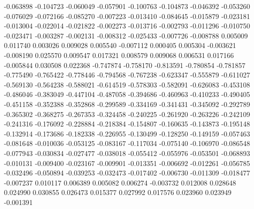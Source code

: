 -0.063898
-0.104723
-0.060049
-0.057901
-0.100763
-0.104873
-0.046392
-0.053260
-0.076029
-0.072166
-0.085270
-0.007223
-0.013410
-0.084645
-0.015879
-0.023181
-0.013004
-0.022014
-0.021822
-0.002273
-0.013716
-0.002793
-0.011296
-0.010750
-0.023471
-0.003287
-0.002131
-0.008312
-0.025433
-0.007726
-0.008788
0.005009
0.011740
0.003026
0.009028
0.005540
-0.007112
0.000405
0.005304
-0.003621
-0.008190
0.025570
0.009547
0.017321
0.008579
0.009068
0.006531
0.017166
-0.005844
0.030508
0.022368
-0.747874
-0.758170
-0.813591
-0.780854
-0.781857
-0.775490
-0.765422
-0.778446
-0.794568
-0.767238
-0.623347
-0.555879
-0.611027
-0.569130
-0.564238
-0.588021
-0.614519
-0.578303
-0.582091
-0.626083
-0.453108
-0.486046
-0.383049
-0.447104
-0.487058
-0.394686
-0.460963
-0.410233
-0.490405
-0.451158
-0.352388
-0.352868
-0.299589
-0.334169
-0.341431
-0.345092
-0.292789
-0.365302
-0.368275
-0.267353
-0.324458
-0.240225
-0.261920
-0.263226
-0.242109
-0.241316
-0.176092
-0.228884
-0.218384
-0.154807
-0.160635
-0.143873
-0.195148
-0.132914
-0.173686
-0.182338
-0.226955
-0.130499
-0.128250
-0.149159
-0.057463
-0.081648
-0.010036
-0.053125
-0.083167
-0.117034
-0.075140
-0.106970
-0.086548
-0.077943
-0.030834
-0.027477
-0.038018
-0.055412
-0.055976
-0.053501
-0.068893
-0.010131
-0.009400
-0.023167
-0.009901
-0.013351
-0.006692
-0.012261
-0.056785
-0.032496
-0.050894
-0.039253
-0.032473
-0.017402
-0.006730
-0.011309
-0.018477
-0.007237
0.010117
0.006389
0.005082
0.006274
-0.003732
0.012008
0.028648
0.024990
0.030855
0.026473
0.015377
0.027992
0.017576
0.023960
0.023949
-0.001391
